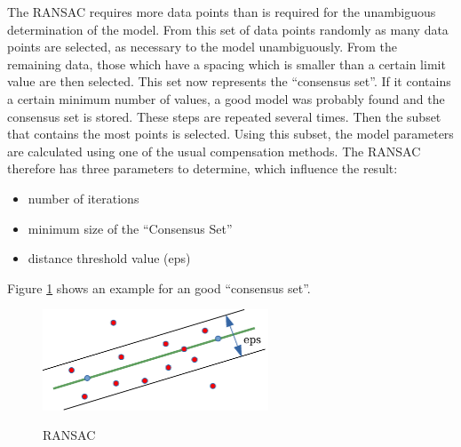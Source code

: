 
The \ac{RANSAC} requires more data points than is required for the unambiguous determination of the model. 
From this set of data points randomly as many data points are selected, as necessary to the model unambiguously. 
From the remaining data, those which have a spacing which is smaller than a certain limit value are then selected.
This set now represents the ``consensus set''. If it contains a certain minimum number of values, a good model was probably found and the consensus set is stored.
These steps are repeated several times. Then the subset that contains the most points is selected. Using this subset, 
the model parameters are calculated using one of the usual compensation methods. The \ac{RANSAC} therefore has three parameters to determine, which influence the result:

\begin{itemize}
 \item number of iterations
 \item minimum size of the ``Consensus Set''
 \item distance threshold value (eps)
\end{itemize}

Figure \ref{ransac} shows an example for an good ``consensus set''.

\begin{figure}[!ht]
\begin{center}
\caption{\acs{RANSAC}}
\includegraphics[width=0.6\textwidth]{bilder/ransac.pdf}
\label{ransac}
\end{center}
\end{figure}



